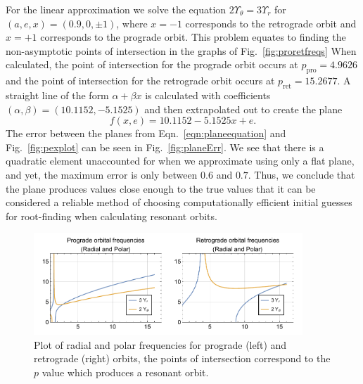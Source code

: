 For the linear approximation we solve the equation $2\Upsilon_\theta=3\Upsilon_r$ for $(a,e,x)=(0.9,0,\pm 1)$, where $x=-1$ corresponds to the retrograde orbit and $x=+1$ corresponds to the prograde orbit.
This problem equates to finding the non-asymptotic points of intersection in the graphs of Fig.~\eqref{fig:proretfreqs}
When calculated, the point of intersection for the prograde orbit occurs at $p_\text{pro}=4.9626$ and the point of intersection for the retrograde orbit occurs at $p_\text{ret}=15.2677$.
A straight line of the form $\alpha+\beta x$ is calculated with coefficients $(\alpha,\beta)=(10.1152,-5.1525)$ and then extrapolated out to create the plane
\begin{equation}\label{eqn:planeequation}
    f(x,e)=10.1152-5.1525x+e.
\end{equation}
The error between the planes from Eqn.~\eqref{eqn:planeequation} and Fig.~\eqref{fig:pexplot} can be seen in Fig.~\eqref{fig:planeErr}.
We see that there is a quadratic element unaccounted for when we approximate using only a flat plane, and yet, the maximum error is only between $0.6$ and $0.7$.
Thus, we conclude that the plane produces values close enough to the true values that it can be considered a reliable method of choosing computationally efficient initial guesses for root-finding when calculating resonant orbits.

\begin{figure}
    \centering
    \includegraphics[width=0.9\textwidth]{images/proretfreqplots.pdf}
    \caption[Plot of radial and polar frequencies for prograde and retrograde orbits]{Plot of radial and polar frequencies for prograde (left) and retrograde (right) orbits, the points of intersection correspond to the $p$ value which produces a resonant orbit.}
    \label{fig:proretfreqs}
\end{figure}

